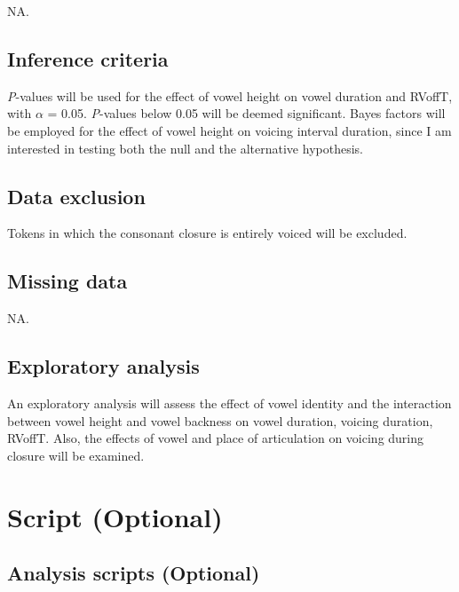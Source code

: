 \documentclass[11pt,]{article}
\begin{document}
NA.

\hypertarget{inference-criteria}{%
\subsection{Inference criteria}\label{inference-criteria}}

\emph{P}-values will be used for the effect of vowel height on vowel
duration and RVoffT, with \(\alpha\) = 0.05. \emph{P}-values below 0.05
will be deemed significant. Bayes factors will be employed for the
effect of vowel height on voicing interval duration, since I am
interested in testing both the null and the alternative hypothesis.

\hypertarget{data-exclusion}{%
\subsection{Data exclusion}\label{data-exclusion}}

Tokens in which the consonant closure is entirely voiced will be
excluded.

\hypertarget{missing-data}{%
\subsection{Missing data}\label{missing-data}}

NA.

\hypertarget{exploratory-analysis}{%
\subsection{Exploratory analysis}\label{exploratory-analysis}}

An exploratory analysis will assess the effect of vowel identity and the
interaction between vowel height and vowel backness on vowel duration,
voicing duration, RVoffT. Also, the effects of vowel and place of
articulation on voicing during closure will be examined.

\hypertarget{script-optional}{%
\section{Script (Optional)}\label{script-optional}}

\hypertarget{analysis-scripts-optional}{%
\subsection{Analysis scripts
(Optional)}\label{analysis-scripts-optional}}
\end{document}
